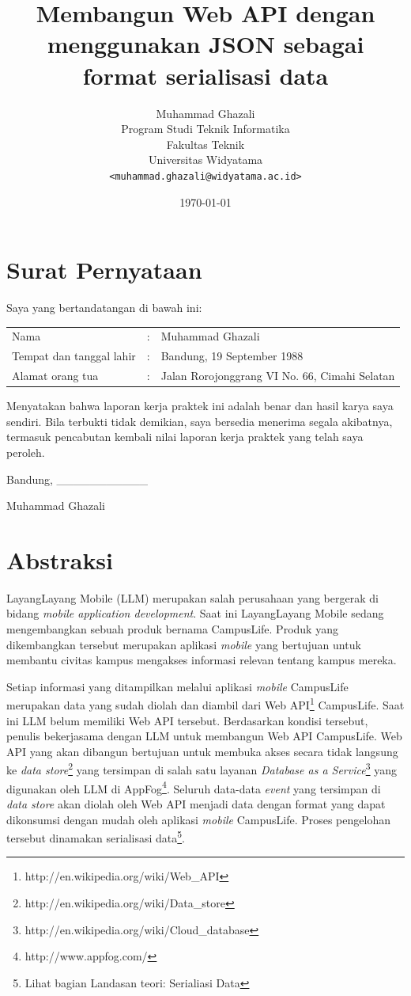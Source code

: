 \documentclass[a4paper, 12pt, oneside]{report}
\title{\textbf{Membangun Web API dengan menggunakan JSON sebagai format serialisasi data}}
\author{
Muhammad Ghazali\\
Program Studi Teknik Informatika\\
Fakultas Teknik\\
Universitas Widyatama
\\\texttt{<muhammad.ghazali@widyatama.ac.id>}
}
\date{\today}
\begin{document}
\maketitle

\chapter*{Surat Pernyataan}

\onehalfspacing Saya yang bertandatangan di bawah ini:

\begin{tabular}{lll}
Nama & : & Muhammad Ghazali\\
Tempat dan tanggal lahir & : & Bandung, 19 September 1988\\
Alamat orang tua & : & Jalan Rorojonggrang VI No. 66, Cimahi Selatan\\
\end{tabular}

\onehalfspacing Menyatakan bahwa laporan kerja praktek ini adalah benar dan hasil karya saya sendiri. Bila terbukti tidak demikian, saya bersedia menerima segala akibatnya, termasuk pencabutan kembali nilai laporan kerja praktek yang telah saya peroleh.

\begin{flushright}
Bandung, \_\_\_\_\_\_\_\_\_\_\_

Muhammad Ghazali

\end{flushright}

\chapter*{Abstraksi}
\onehalfspacing LayangLayang Mobile (LLM) merupakan salah perusahaan yang bergerak di bidang \textit{mobile application development}. Saat ini LayangLayang Mobile sedang mengembangkan sebuah produk bernama CampusLife. Produk yang dikembangkan tersebut merupakan aplikasi \textit{mobile} yang bertujuan untuk membantu civitas kampus mengakses informasi relevan tentang kampus mereka.

\onehalfspacing Setiap informasi yang ditampilkan melalui aplikasi \textit{mobile} CampusLife merupakan data yang sudah diolah dan diambil dari Web API\footnote{http://en.wikipedia.org/wiki/Web\_API} CampusLife. Saat ini LLM belum memiliki Web API tersebut. Berdasarkan kondisi tersebut, penulis bekerjasama dengan LLM untuk membangun Web API CampusLife. Web API yang akan dibangun bertujuan untuk membuka akses secara tidak langsung ke \textit{data store}\footnote{http://en.wikipedia.org/wiki/Data\_store} yang tersimpan di salah satu layanan \textit{Database as a Service}\footnote{http://en.wikipedia.org/wiki/Cloud\_database} yang digunakan oleh LLM di AppFog\footnote{http://www.appfog.com/}. Seluruh data-data \textit{event} yang tersimpan di \textit{data store} akan diolah oleh Web API menjadi data dengan format yang dapat dikonsumsi dengan mudah oleh aplikasi \textit{mobile} CampusLife. Proses pengelohan tersebut dinamakan serialisasi data\footnote{Lihat bagian Landasan teori: Serialiasi Data}.
\end{document}

